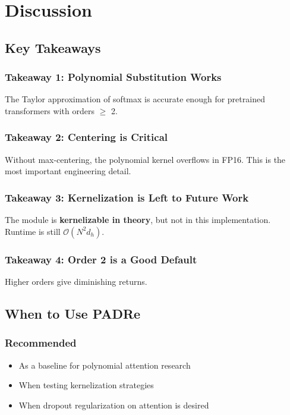 \section{Discussion}

\subsection{Key Takeaways}

\subsubsection{Takeaway 1: Polynomial Substitution Works}

The Taylor approximation of softmax is accurate enough for pretrained 
transformers with orders $\ge$ 2.

\subsubsection{Takeaway 2: Centering is Critical}

Without max-centering, the polynomial kernel overflows in FP16. This is 
the most important engineering detail.

\subsubsection{Takeaway 3: Kernelization is Left to Future Work}

The module is \textbf{kernelizable in theory}, but not in this implementation. 
Runtime is still $\mathcal{O}(N^2 d_h)$.

\subsubsection{Takeaway 4: Order 2 is a Good Default}

Higher orders give diminishing returns.

\subsection{When to Use PADRe}

\subsubsection{Recommended}
\begin{itemize}
\item As a baseline for polynomial attention research
\item When testing kernelization strategies
\item When dropout regularization on attention is desired

\end{itemize}

